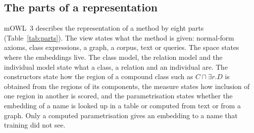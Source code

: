 \documentclass[runningheads]{llncs}
\begin{document}
\subsection{The parts of a representation}

mOWL~3 describes the representation of a method by eight parts
(Table~\ref{tab:parts}). The view states what the method is given: normal-form axioms,
class expressions, a graph, a corpus, text or queries. The space states where the
embeddings live. The class model, the relation model and the individual model state what
a class, a relation and an individual are. The constructors state how the region of a
compound class such as $C \sqcap \exists r.D$ is obtained from the regions of its
components, the measure states how inclusion of one region in another is scored, and the
parametrisation states whether the embedding of a name is looked up in a table or
computed from text or from a graph. Only a computed parametrisation gives an embedding
to a name that training did not see.

\begin{table}[t]
\caption{The parts of a representation in mOWL~3, with the values of two published
methods.}\label{tab:parts}
\centering\footnotesize\setlength{\tabcolsep}{4pt}
\end{table}
\end{document}
